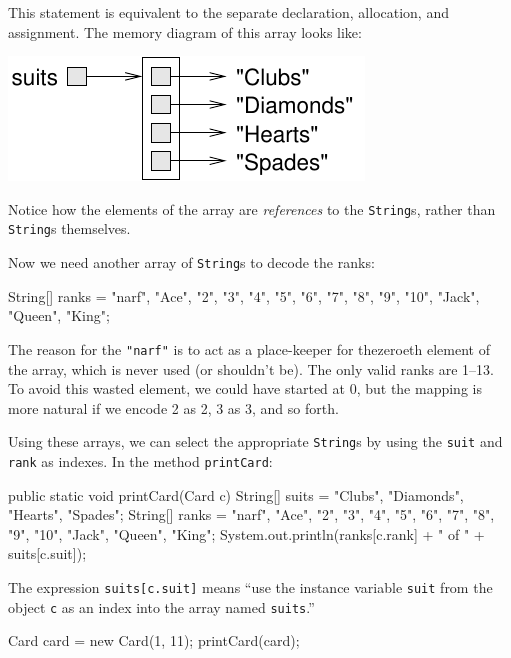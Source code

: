 \documentclass[12pt]{book}
\theoremstyle{exercise}
\newcommand{\java}[1]{\lstinline{#1}} %
\begin{document}
This statement is equivalent to the separate declaration, allocation, and assignment.
The memory diagram of this array looks like:

\begin{center}
\includegraphics{figs/stringarray.pdf}
\end{center}


Notice how the elements of the array are {\em references} to the \java{String}s, rather than \java{String}s themselves.

Now we need another array of \java{String}s to decode the ranks:

\begin{code}
    String[] ranks = {"narf", "Ace", "2", "3", "4", "5", "6",
               "7", "8", "9", "10", "Jack", "Queen", "King"};
\end{code}

The reason for the \java{"narf"} is to act as a place-keeper for thezeroeth element of the array, which is never used (or shouldn't be).
The only valid ranks are 1--13.
To avoid this wasted element, we could have started at 0, but the mapping is more natural if we encode 2 as 2, 3 as 3, and so forth.

Using these arrays, we can select the appropriate \java{String}s by using the \java{suit} and \java{rank} as indexes.
In the method \java{printCard}:

\begin{code}
public static void printCard(Card c) {
    String[] suits = {"Clubs", "Diamonds", "Hearts", "Spades"};
    String[] ranks = {"narf", "Ace", "2", "3", "4", "5", "6",
               "7", "8", "9", "10", "Jack", "Queen", "King"};
    System.out.println(ranks[c.rank] + " of " + suits[c.suit]);
}
\end{code}

The expression \java{suits[c.suit]} means ``use the instance variable \java{suit} from the object \java{c} as an index into the array named \java{suits}.''

\begin{code}
    Card card = new Card(1, 11);
    printCard(card);
\end{code}
\end{document}
